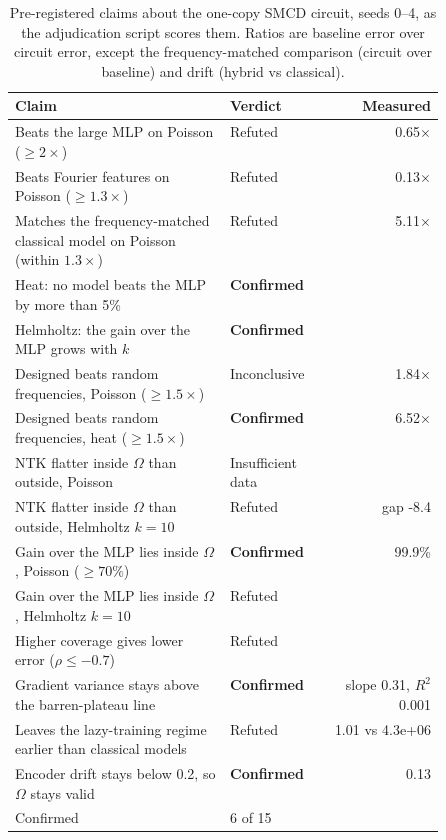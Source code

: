 \begin{table}[htbp]
  \centering
  \small
  \begin{tabular}{p{0.5\linewidth}lr}
  \toprule
  Claim & Verdict & Measured \\
  \midrule
  Beats the large MLP on Poisson ($\ge2\times$) & Refuted & 0.65$\times$ \\
  Beats Fourier features on Poisson ($\ge1.3\times$) & Refuted & 0.13$\times$ \\
  Matches the frequency-matched classical model on Poisson (within $1.3\times$) & Refuted & 5.11$\times$ \\
  Heat: no model beats the MLP by more than 5\% & \textbf{Confirmed} &  \\
  Helmholtz: the gain over the MLP grows with $k$ & \textbf{Confirmed} &  \\
  Designed beats random frequencies, Poisson ($\ge1.5\times$) & Inconclusive & 1.84$\times$ \\
  Designed beats random frequencies, heat ($\ge1.5\times$) & \textbf{Confirmed} & 6.52$\times$ \\
  NTK flatter inside $\Omega$ than outside, Poisson & Insufficient data &  \\
  NTK flatter inside $\Omega$ than outside, Helmholtz $k{=}10$ & Refuted & gap -8.4 \\
  Gain over the MLP lies inside $\Omega$, Poisson ($\ge70\%$) & \textbf{Confirmed} & 99.9\% \\
  Gain over the MLP lies inside $\Omega$, Helmholtz $k{=}10$ & Refuted &  \\
  Higher coverage gives lower error ($\rho\le-0.7$) & Refuted &  \\
  Gradient variance stays above the barren-plateau line & \textbf{Confirmed} & slope 0.31, $R^2$ 0.001 \\
  Leaves the lazy-training regime earlier than classical models & Refuted & 1.01 vs 4.3e+06 \\
  Encoder drift stays below 0.2, so $\Omega$ stays valid & \textbf{Confirmed} & 0.13 \\
  \midrule
  Confirmed & 6 of 15 & \\
  \bottomrule
  \end{tabular}
  \caption{Pre-registered claims about the one-copy SMCD circuit, seeds 0--4, as the adjudication
    script scores them. Ratios are baseline error over circuit error, except the
    frequency-matched comparison (circuit over baseline) and drift (hybrid vs classical).}
  \label{tab:claims}
\end{table}

